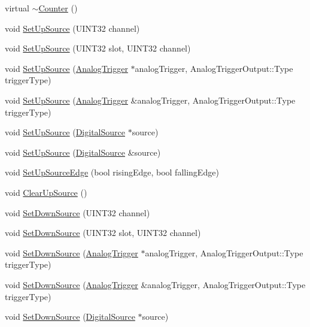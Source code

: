 \begin{DoxyCompactItemize}
\item 
virtual \hyperlink{classCounter_a97f4728470ae8eff37d50ef1d6bb0135}{$\sim$\-Counter} ()
\item 
void \hyperlink{classCounter_a2788b50d591e9b9058bc7250268ced5d}{\-Set\-Up\-Source} (\-U\-I\-N\-T32 channel)
\item 
void \hyperlink{classCounter_af7dae6fde717e8759980591bb73c8b9f}{\-Set\-Up\-Source} (\-U\-I\-N\-T32 slot, \-U\-I\-N\-T32 channel)
\item 
void \hyperlink{classCounter_a8e9838e4f44bf8111356ecdbbab833d9}{\-Set\-Up\-Source} (\hyperlink{classAnalogTrigger}{\-Analog\-Trigger} $\ast$analog\-Trigger, \-Analog\-Trigger\-Output\-::\-Type trigger\-Type)
\item 
void \hyperlink{classCounter_a8cddeb27c997a2cd5e7372367b6d8ced}{\-Set\-Up\-Source} (\hyperlink{classAnalogTrigger}{\-Analog\-Trigger} \&analog\-Trigger, \-Analog\-Trigger\-Output\-::\-Type trigger\-Type)
\item 
void \hyperlink{classCounter_a0687b78f7bf8a269d653eddca1819d5d}{\-Set\-Up\-Source} (\hyperlink{classDigitalSource}{\-Digital\-Source} $\ast$source)
\item 
void \hyperlink{classCounter_a0015c2da61df6011bfbaf20bbf62982d}{\-Set\-Up\-Source} (\hyperlink{classDigitalSource}{\-Digital\-Source} \&source)
\item 
void \hyperlink{classCounter_af75f91bb8b014b04585b5bebb102e65d}{\-Set\-Up\-Source\-Edge} (bool rising\-Edge, bool falling\-Edge)
\item 
void \hyperlink{classCounter_adfbbfef3d5b90d61d2a3702c3876e599}{\-Clear\-Up\-Source} ()
\item 
void \hyperlink{classCounter_a61624bde53b714db868b422ad1e35813}{\-Set\-Down\-Source} (\-U\-I\-N\-T32 channel)
\item 
void \hyperlink{classCounter_a0ff428aada4f88ce538fb9a6a61d37c7}{\-Set\-Down\-Source} (\-U\-I\-N\-T32 slot, \-U\-I\-N\-T32 channel)
\item 
void \hyperlink{classCounter_a672fefa4c325665617f38e6588d83541}{\-Set\-Down\-Source} (\hyperlink{classAnalogTrigger}{\-Analog\-Trigger} $\ast$analog\-Trigger, \-Analog\-Trigger\-Output\-::\-Type trigger\-Type)
\item 
void \hyperlink{classCounter_a74064fcd79b179aaf782d4ae8e7bd42e}{\-Set\-Down\-Source} (\hyperlink{classAnalogTrigger}{\-Analog\-Trigger} \&analog\-Trigger, \-Analog\-Trigger\-Output\-::\-Type trigger\-Type)
\item 
void \hyperlink{classCounter_a667ea67a66e39b5ce6727f49253bae02}{\-Set\-Down\-Source} (\hyperlink{classDigitalSource}{\-Digital\-Source} $\ast$source)

\end{DoxyCompactItemize}
